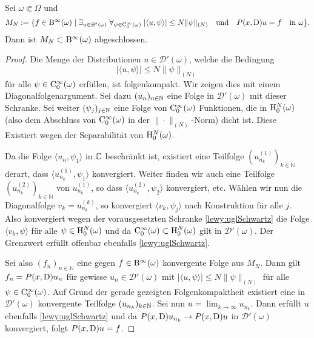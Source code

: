 \begin{lem}\label{lm:closed}
Sei $\omega\Subset\Omega$ und
\begin{equation}
M_N:= \{f\in \mathrm B^\infty(\omega)\mid \exists_{u\in\mathscr D'(\omega)}\; \forall_{\psi\in\mathrm C_0^\infty(\omega)}\; |\langle u,\psi\rangle | \le N \|\psi\|_{(N)} \quad\text{und}\quad P(x,\mathrm{D})u=f\quad \text{in $\omega$} \}.
\end{equation}
Dann ist $M_N\subset \mathrm B^\infty(\omega)$ abgeschlossen.
\end{lem}

\begin{proof}
Die Menge der Distributionen $u\in\mathscr D'(\omega)$, welche die  Bedingung 
\begin{equation}\label{lewy:uglSchwartz}
|\langle u,\psi\rangle|\leq N\|\psi\|_{(N)} 
\end{equation}
für alle $\psi\in\mathrm C_0^\infty(\omega)$ erfüllen, ist folgenkompakt. Wir zeigen dies mit einem Diagonalfolgenargument.
Sei dazu $(u_n)_{n\in\mathbb N}$ eine Folge in $\mathscr D'(\omega)$ mit dieser Schranke. Sei weiter $(\psi_j)_{j\in\mathbb N}$ eine Folge
von $\mathrm C_0^\infty(\omega)$ Funktionen, die in $\mathrm H^N_0(\omega)$ (also dem Abschluss von $\mathrm C_0^\infty(\omega)$ in der $\|\cdot\|_{(N)}$-Norm) dicht ist.
Diese Existiert wegen der Separabilität von $\mathrm H_0^N(\omega)$.

Da die Folge $\langle u_n,\psi_1\rangle$ in $\mathbb C$ beschränkt ist, existiert eine Teilfolge $(u_{n_k}^{(1)})_{k\in\mathbb{N}}$ derart, dass
$\langle u_{n_k}^{(1)},\psi_1\rangle$ konvergiert. Weiter finden wir auch eine Teilfolge $(u_{n_k}^{(2)})_{k\in\mathbb{N}}$ von $u_{n_k}^{(1)}$, so dass $\langle u_{n_k}^{(2)},\psi_2\rangle$ konvergiert, etc. Wählen wir nun die Diagonalfolge $v_k = u_{n_k}^{(k)}$, so konvergiert $\langle v_k,\psi_j\rangle$ nach Konstruktion für alle $j$. 
Also konvergiert wegen der vorausgesetzten Schranke \eqref{lewy:uglSchwartz} die Folge   $\langle v_k,\psi\rangle$  für alle $\psi\in\mathrm H^N_0(\omega)$ und da $\mathrm C_0^\infty(\omega)\subset \mathrm H_0^N(\omega)$ gilt in $\mathscr D'(\omega)$. Der Grenzwert erfüllt offenbar ebenfalls \eqref{lewy:uglSchwartz}.

Sei also $(f_n)_{n\in\mathbb{N}}$ eine gegen $f\in \mathrm B^\infty(\omega)$ konvergente Folge aus $M_N$. Dann gilt  $f_n=P(x,\mathrm D)u_n$ für gewisse $u_n\in\mathscr{D}'(\omega)$ mit  $|\langle u,\psi\rangle | \le N \|\psi\|_{(N)}$ für alle $\psi\in\mathrm C_0^\infty(\omega)$. Auf Grund der gerade gezeigten Folgenkompaktheit existiert eine in $\mathscr D'(\omega)$  konvergente Teilfolge $(u_{n_k})_{k\in\mathbb N}$. Sei nun $u=\lim_{k\rightarrow\infty}u_{n_k}$. Dann erfüllt $u$ ebenfalls  
 \eqref{lewy:uglSchwartz} und da $P(x,\mathrm D)u_{n_k}\to P(x,\mathrm D)u$ in $\mathscr D'(\omega)$ konvergiert, folgt $P(x,\mathrm D)u=f$.
\end{proof}
